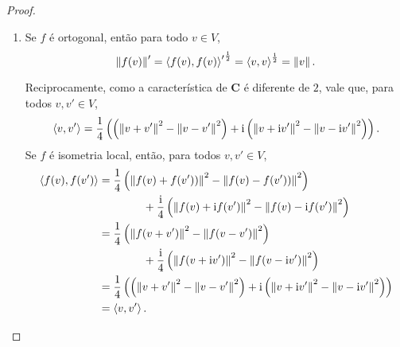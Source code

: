 \begin{proof}
	\begin{enumerate}
	\item Se $f$ é ortogonal, então para todo $v \in V$,
	\begin{equation*}
	\left\Vert{f(v)}\right\Vert' = {\left\langle{f(v)},{f(v)}\right\rangle'}^\frac{1}{2} = {\left\langle{v},{v}\right\rangle}^\frac{1}{2} = \left\Vert{v}\right\Vert.
	\end{equation*}

Reciprocamente, como a característica de $\bm C$ é diferente de $2$, vale que, para todos $v,v' \in V$,
		\begin{equation*}
		\left\langle{v},{v'}\right\rangle = \frac{1}{4} \left( \left(\left\Vert{v+v'}\right\Vert^2 - \left\Vert{v-v'}\right\Vert^2\right) + \mathrm{i} \left(\left\Vert{v+\mathrm{i}v'}\right\Vert^2 - \left\Vert{v-\mathrm{i}v'}\right\Vert^2\right) \right).
		\end{equation*}
Se $f$ é isometria local, então, para todos $v,v' \in V$,
	\begin{align*}
		\left\langle{f(v)},{f(v')}\right\rangle 	&= \frac{1}{4}\left(\left\Vert{f(v)+f(v'))}\right\Vert^2 - \left\Vert{f(v)-f(v'))}\right\Vert^2\right) \\
		&\qquad\qquad + \frac{\mathrm{i}}{4} \left(\left\Vert{f(v)+\mathrm{i}f(v')}\right\Vert^2 - \left\Vert{f(v)-\mathrm{i}f(v')}\right\Vert^2\right) \\
		&= \frac{1}{4}\left(\left\Vert{f(v+v')}\right\Vert^2 - \left\Vert{f(v-v')}\right\Vert^2\right) \\
		&\qquad\qquad + \frac{\mathrm{i}}{4}\left(\left\Vert{f(v+\mathrm{i}v')}\right\Vert^2 - \left\Vert{f(v-\mathrm{i}v')}\right\Vert^2\right) \ \\
		&= \frac{1}{4} \left( \left(\left\Vert{v+v'}\right\Vert^2 - \left\Vert{v-v'}\right\Vert^2\right) + \mathrm{i} \left(\left\Vert{v+\mathrm{i}v'}\right\Vert^2 - \left\Vert{v-\mathrm{i}v'}\right\Vert^2\right) \right) \\
		&= \left\langle{v},{v'}\right\rangle.
	\end{align*}





\end{enumerate}
\end{proof}
